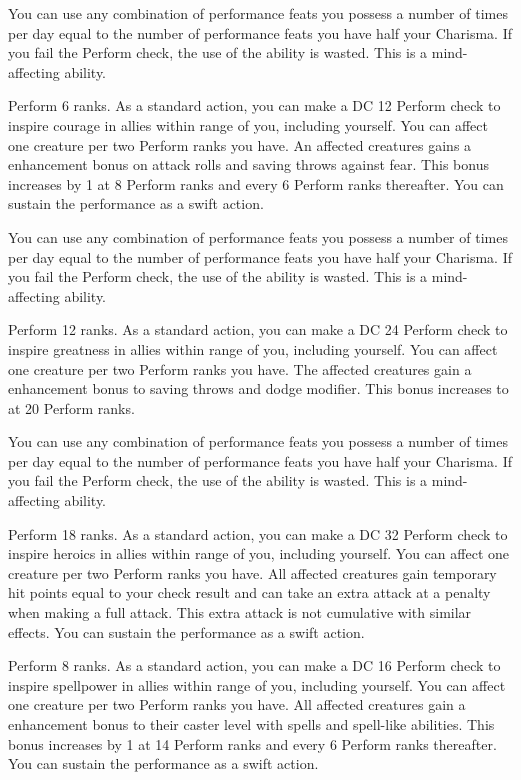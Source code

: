 You can use any combination of performance feats you possess a number of times per day equal to the number of performance feats you have \add half your Charisma. If you fail the Perform check, the use of the ability is wasted. This is a mind-affecting ability.

\featpre Perform 6 ranks.
\featben As a standard action, you can make a DC 12 Perform check to inspire courage in allies within \rngmed range of you, including yourself. You can affect one creature per two Perform ranks you have. An affected creatures gains a  enhancement bonus on attack rolls and saving throws against fear. This bonus increases by 1 at 8 Perform ranks and every 6 Perform ranks thereafter. You can sustain the performance as a swift action. 

You can use any combination of performance feats you possess a number of times per day equal to the number of performance feats you have \add half your Charisma. If you fail the Perform check, the use of the ability is wasted. This is a mind-affecting ability.

\featpre Perform 12 ranks.
\featben As a standard action, you can make a DC 24 Perform check to inspire greatness in allies within \rngmed range of you, including yourself. You can affect one creature per two Perform ranks you have. The affected creatures gain a  enhancement bonus to saving throws and dodge modifier. This bonus increases to  at 20 Perform ranks.

You can use any combination of performance feats you possess a number of times per day equal to the number of performance feats you have \add half your Charisma. If you fail the Perform check, the use of the ability is wasted. This is a mind-affecting ability.

\featpre Perform 18 ranks.
\featben As a standard action, you can make a DC 32 Perform check to inspire heroics in allies within \rngmed range of you, including yourself. You can affect one creature per two Perform ranks you have. All affected creatures gain temporary hit points equal to your check result and can take an extra attack at a  penalty when making a full attack. This extra attack is not cumulative with similar effects. You can sustain the performance as a swift action.

\featpre Perform 8 ranks.
\featben As a standard action, you can make a DC 16 Perform check to inspire spellpower in allies within \rngmed range of you, including yourself. You can affect one creature per two Perform ranks you have. All affected creatures gain a  enhancement bonus to their caster level with spells and spell-like abilities. This bonus increases by 1 at 14 Perform ranks and every 6 Perform ranks thereafter. You can sustain the performance as a swift action.


